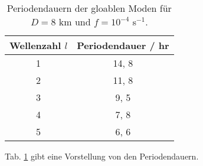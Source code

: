 %
\renewcommand{\arraystretch}{1.2}
\begin{table}
\centering
\begin{tabular}{|c|c|}
\hline \textbf{Wellenzahl $l$} & \textbf{Periodendauer / hr} \\
\hline\hline
1 & 14, 8 \\
\hline 
2 & 11, 8 \\
\hline 
3 & 9, 5 \\
\hline 
4 & 7, 8 \\
\hline 
5 & 6, 6 \\
\hline 
\end{tabular}
\caption{Periodendauern der gloablen Moden für $D = 8$ km und $f = 10^{-4}$ s$^{-1}$.}
\label{tab:perioden_glob}
\end{table}
\renewcommand{\arraystretch}{1.0}
%
Tab. \ref{tab:perioden_glob} gibt eine Vorstellung von den Periodendauern.

